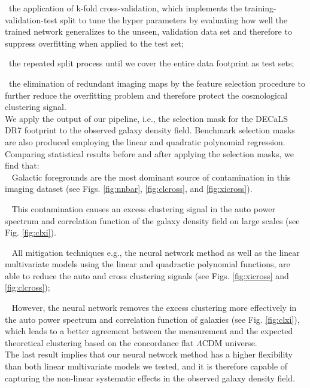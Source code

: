 \documentclass[fleqn, usenatbib]{mnras}
\begin{document}
\textbullet ~the application of k-fold cross-validation, which implements the training-validation-test split to tune the hyper parameters by evaluating how well the trained network generalizes to the unseen,  validation data set and therefore to suppress overfitting when applied to the test set;

\textbullet ~the repeated split process until we cover the entire data footprint as test sets;

\textbullet ~the elimination of redundant imaging maps by the feature selection procedure to further reduce the overfitting problem and therefore protect the cosmological clustering signal.\\

We apply the output of our pipeline, i.e., the selection mask for the DECaLS DR7 footprint to the observed galaxy density field. Benchmark selection masks are also produced employing the linear and quadratic polynomial regression. Comparing statistical results before and after applying the selection masks, we find that:\\

\textbullet ~  Galactic foregrounds are the most dominant source of contamination in this imaging dataset (see Figs. \ref{fig:nnbar}, \ref{fig:clcross}, and \ref{fig:xicross}).

\textbullet ~    This contamination causes an excess clustering signal in the auto power spectrum and correlation function of the galaxy density field on large scales (see Fig. \ref{fig:clxi}).

\textbullet ~    All mitigation techniques e.g., the neural network method as well as the linear multivariate models using the linear and quadractic polynomial functions, are able to reduce the auto and cross clustering signals (see Figs. \ref{fig:xicross} and \ref{fig:clcross}); 

\textbullet ~ However, the neural network removes the excess clustering more effectively  in the auto power spectrum and correlation function of galaxies (see Fig. \ref{fig:clxi}), which leads to a better agreement between the measurement and the expected theoretical clustering based on the concordance flat $\Lambda$CDM universe.\\ 


The last result implies that our neural network method has a higher flexibility than both linear multivariate models we tested, and it is therefore capable of capturing the non-linear systematic effects in the observed galaxy density field.\\
\end{document}
